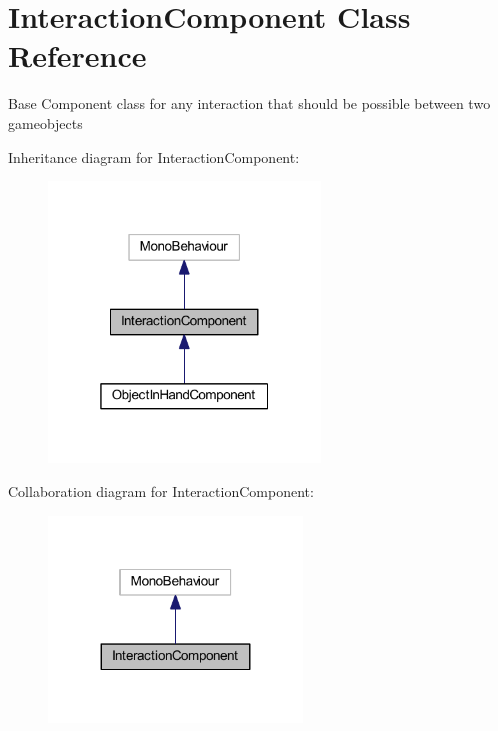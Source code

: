 \hypertarget{class_interaction_component}{}\section{Interaction\+Component Class Reference}
\label{class_interaction_component}


Base Component class for any interaction that should be possible between two gameobjects  




Inheritance diagram for Interaction\+Component\+:
\nopagebreak
\begin{figure}[H]
\begin{center}
\leavevmode
\includegraphics[width=205pt]{class_interaction_component__inherit__graph}
\end{center}
\end{figure}


Collaboration diagram for Interaction\+Component\+:
\nopagebreak
\begin{figure}[H]
\begin{center}
\leavevmode
\includegraphics[width=191pt]{class_interaction_component__coll__graph}
\end{center}
\end{figure}
